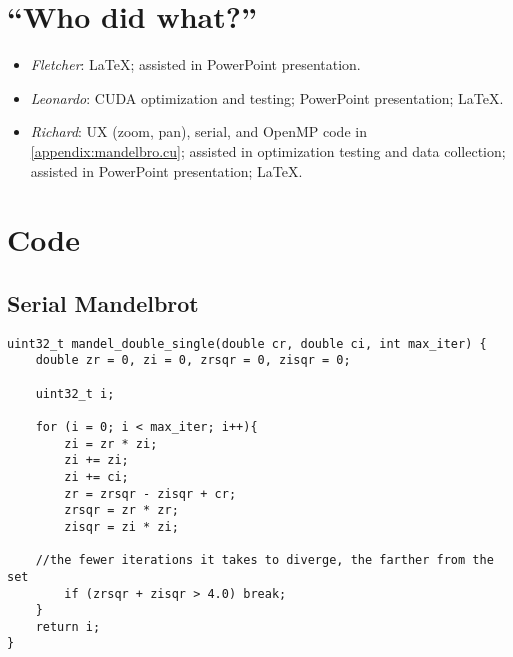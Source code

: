 \documentclass{article}
\begin{document}
\section{``Who did what?''}
\begin{itemize}
	\item \emph{Fletcher}: \LaTeX{}; assisted in PowerPoint presentation.

	\item \emph{Leonardo}: CUDA optimization and testing; PowerPoint presentation; \LaTeX{}.

	\item \emph{Richard}: UX (zoom, pan), serial, and OpenMP code in \ref{appendix:mandelbro.cu}; assisted in optimization testing and data collection; assisted in PowerPoint presentation; \LaTeX{}.
\end{itemize}

\section{Code}
\lstset{language=C,stringstyle=\ttfamily, showstringspaces=false, numbers=left, frame=single, framexrightmargin=0pt, columns=fullflexible, breaklines=true, breakatwhitespace=true}

\subsection{Serial Mandelbrot}\label{appendix:serial}
\begin{lstlisting}
uint32_t mandel_double_single(double cr, double ci, int max_iter) {
    double zr = 0, zi = 0, zrsqr = 0, zisqr = 0;

    uint32_t i;

    for (i = 0; i < max_iter; i++){
		zi = zr * zi;
		zi += zi;
		zi += ci;
		zr = zrsqr - zisqr + cr;
		zrsqr = zr * zr;
		zisqr = zi * zi;
		
    //the fewer iterations it takes to diverge, the farther from the set
		if (zrsqr + zisqr > 4.0) break;
    }
    return i;
}
\end{lstlisting}
\end{document}
